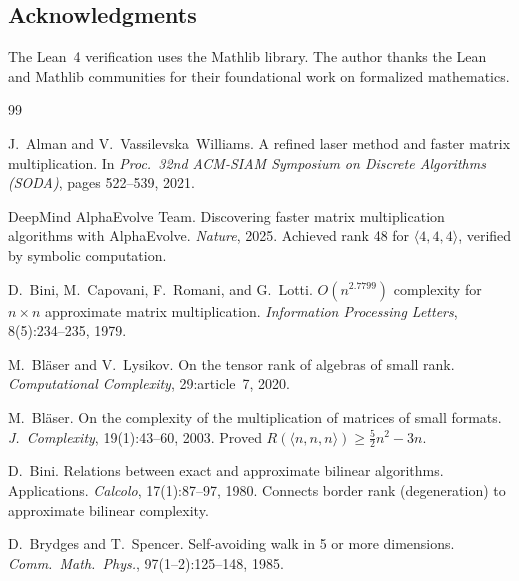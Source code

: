 \documentclass[11pt,a4paper]{article}
\theoremstyle{definition}
\theoremstyle{remark}
\begin{document}
\subsection*{Acknowledgments}
The Lean~4 verification uses the Mathlib library. The author thanks
the Lean and Mathlib communities for their foundational work on
formalized mathematics.

\begin{thebibliography}{99}

J.~Alman and V.~Vassilevska~Williams.
\newblock A refined laser method and faster matrix multiplication.
\newblock In \emph{Proc.\ 32nd ACM-SIAM Symposium on Discrete
Algorithms (SODA)}, pages 522--539, 2021.

DeepMind AlphaEvolve Team.
\newblock Discovering faster matrix multiplication algorithms with
AlphaEvolve.
\newblock \emph{Nature}, 2025.
\newblock Achieved rank 48 for $\langle 4,4,4 \rangle$, verified
by symbolic computation.

D.~Bini, M.~Capovani, F.~Romani, and G.~Lotti.
\newblock $O(n^{2.7799})$ complexity for $n \times n$ approximate
matrix multiplication.
\newblock \emph{Information Processing Letters}, 8(5):234--235, 1979.

M.~Bl\"aser and V.~Lysikov.
\newblock On the tensor rank of algebras of small rank.
\newblock \emph{Computational Complexity}, 29:article~7, 2020.

M.~Bl\"aser.
\newblock On the complexity of the multiplication of matrices of small
formats.
\newblock \emph{J.~Complexity}, 19(1):43--60, 2003.
\newblock Proved $R(\langle n,n,n \rangle) \ge \tfrac{5}{2}n^2 - 3n$.

D.~Bini.
\newblock Relations between exact and approximate bilinear algorithms.
Applications.
\newblock \emph{Calcolo}, 17(1):87--97, 1980.
\newblock Connects border rank (degeneration) to approximate bilinear
complexity.

D.~Brydges and T.~Spencer.
\newblock Self-avoiding walk in 5 or more dimensions.
\newblock \emph{Comm.\ Math.\ Phys.}, 97(1--2):125--148, 1985.


\end{thebibliography}
\end{document}
